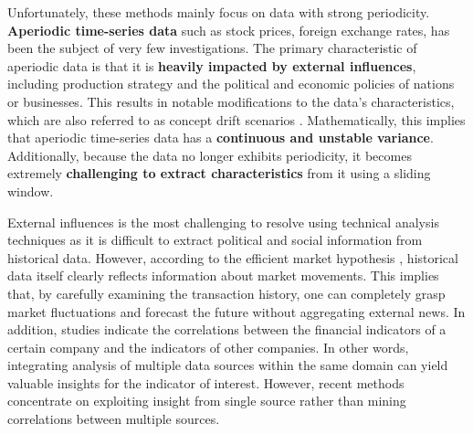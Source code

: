 \documentclass[a4paper,fleqn]{cas-sc}
\begin{document}

Unfortunately, these methods mainly focus on data with strong periodicity. \textbf{Aperiodic time-series data} such as stock prices, foreign exchange rates, has been the subject of very few investigations. The primary characteristic of aperiodic data is that it is \textbf{heavily impacted by external influences}, including production strategy and the political and economic policies of nations or businesses. This results in notable modifications to the data's characteristics, which are also referred to as concept drift scenarios \cite{liu2025onsitnet}. Mathematically, this implies that aperiodic time-series data has a \textbf{continuous and unstable variance}. Additionally, because the data no longer exhibits periodicity, it becomes extremely \textbf{challenging to extract characteristics} from it using a sliding window.

\vspace{1mm}



External influences is the most challenging to resolve using technical analysis techniques as it is difficult to extract political and social information from historical data. However, according to the efficient market hypothesis \cite{fama1970efficient}, historical data itself clearly reflects information about market movements. This implies that, by carefully examining the transaction history, one can completely grasp market fluctuations and forecast the future without aggregating external news. In addition, studies \cite{overreactioncontrarian, mech1993portfolio} indicate the correlations between the financial indicators of a certain company and the indicators of other companies. In other words, integrating analysis of multiple data sources within the same domain can yield valuable insights for the indicator of interest. However, recent methods concentrate on exploiting insight from single source rather than mining correlations between multiple sources.

\vspace{1mm}
\end{document}
